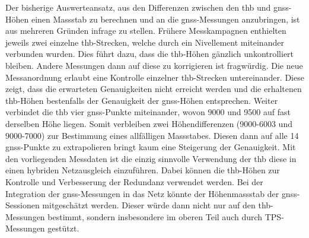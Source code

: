 Der bisherige Auswerteansatz, aus den Differenzen zwischen den \gls{thb} und \acrshort{gnss}-Höhen einen Massstab zu 
berechnen und an die \acrshort{gnss}-Messungen anzubringen, ist aus mehreren Gründen infrage zu stellen. 
Frühere Messkampagnen enthielten jeweils zwei einzelne \acrshort{thb}-Strecken, welche durch ein Nivellement 
miteinander verbunden wurden. Dies führt dazu, dass die \acrshort{thb}-Höhen gänzlich unkontrolliert bleiben. Andere Messungen 
dann auf diese zu korrigieren ist fragwürdig. Die neue Messanordnung erlaubt eine Kontrolle einzelner \acrshort{thb}-Strecken 
untereinander. Diese zeigt, dass die erwarteten Genauigkeiten nicht erreicht werden und 
die erhaltenen \acrshort{thb}-Höhen bestenfalls der Genauigkeit der \acrshort{gnss}-Höhen entsprechen. 
Weiter verbindet die \gls{thb} vier \acrshort{gnss}-Punkte miteinander, wovon 9000 und 9500 auf fast derselben Höhe liegen. 
Somit verbleiben zwei Höhendifferenzen (9000-6003 und 9000-7000) zur Bestimmung eines allfälligen Massstabes. 
Diesen dann auf alle 14 \acrshort{gnss}-Punkte zu extrapolieren bringt kaum eine Steigerung der Genauigkeit. 
Mit den vorliegenden Messdaten ist die einzig sinnvolle Verwendung der \gls{thb} diese in einen hybriden 
Netzausgleich einzuführen. Dabei können die \acrshort{thb}-Höhen zur Kontrolle und Verbesserung der Redundanz verwendet 
werden. Bei der Integration der \acrshort{gnss}-Messungen in das Netz könnte der Höhenmassstab der \acrshort{gnss}-Sessionen mitgeschätzt werden. 
Dieser würde dann nicht nur auf den \acrshort{thb}-Messungen bestimmt, sondern insbesondere im oberen Teil auch durch 
TPS-Messungen gestützt.